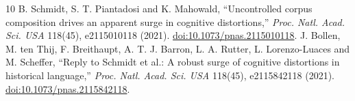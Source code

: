 \documentclass[11pt]{article}
\begin{document}
\begin{thebibliography}{10}
 B. Schmidt, S. T. Piantadosi and K. Mahowald, ``Uncontrolled corpus composition drives an apparent surge in cognitive distortions,'' \emph{Proc. Natl. Acad. Sci. USA} 118(45), e2115010118 (2021). \href{https://doi.org/10.1073/pnas.2115010118}{doi:10.1073/pnas.2115010118}.
 J. Bollen, M. ten Thij, F. Breithaupt, A. T. J. Barron, L. A. Rutter, L. Lorenzo-Luaces and M. Scheffer, ``Reply to Schmidt et al.: A robust surge of cognitive distortions in historical language,'' \emph{Proc. Natl. Acad. Sci. USA} 118(45), e2115842118 (2021). \href{https://doi.org/10.1073/pnas.2115842118}{doi:10.1073/pnas.2115842118}.
\end{thebibliography}
\end{document}
